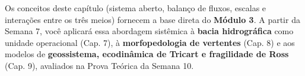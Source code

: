 \begin{boxDica}
  Os conceitos deste capítulo (sistema aberto, balanço de fluxos, escalas e interações entre os três meios) fornecem a base direta do \textbf{Módulo 3}. A partir da Semana 7, você aplicará essa abordagem sistêmica à \textbf{bacia hidrográfica} como unidade operacional (Cap. 7), à \textbf{morfopedologia de vertentes} (Cap. 8) e aos modelos de \textbf{geossistema, ecodinâmica de Tricart e fragilidade de Ross} (Cap. 9), avaliados na Prova Teórica da Semana 10.
\end{boxDica}

\clearpage
{}

